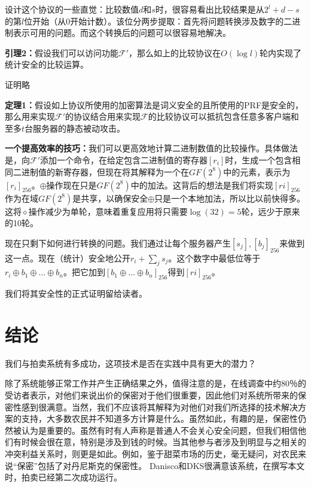 设计这个协议的一些直觉：比较数值$d$和$s$时，很容易看出比较结果是从$2^l+d-s$的第$l$位开始（从0开始计数）。该位分两步提取：首先将问题转换涉及数字的二进制表示可用的问题。而这个转换后的问题可以很容易地解决。
\newline

\noindent\textbf{引理2：}假设我们可以访问功能$\mathcal{F}'$，那么如上的比较协议在$O(\log l)$轮内实现了统计安全的比较运算。

证明略
\newline

\noindent\textbf{定理1：}假设如上协议所使用的加密算法是词义安全的且所使用的PRF是安全的，那么用来实现$\mathcal{F}'$的协议结合用来实现$\mathcal{F}$的比较协议可以抵抗包含任意多客户端和至多$t$台服务器的静态被动攻击。
\newline

\textbf{一个提高效率的技巧：}我们可以更高效地计算二进制数值的比较操作。具体做法是，向$\mathcal{F}'$添加一个命令，在给定包含二进制值的寄存器$[r_i]$时，生成一个包含相同二进制值的新寄存器，但现在将其解释为一个在$GF(2^8)$中的元素，表示为$[r_i]_{256}$。$\oplus$操作现在只是$GF(2^8)$中的加法。这背后的想法是我们将实现$[ri]_{256}$作为在域$GF(2^8)$是共享，以确保安全$\oplus$只是一个本地加法，所以比以前快得多。这将$\diamond$操作减少为单轮，意味着重复应用将只需要$\log(32)=5$轮，远少于原来的10轮。

现在只剩下如何进行转换的问题。我们通过让每个服务器产生$[s_j],[b_j]_{256}$来做到这一点。现在（统计）安全地公开$r_i+\sum_j s_j$。这个数字中最低位等于$r_i\oplus b_1\oplus\dots\oplus b_n$。把它加到$[b_1\oplus\dots\oplus b_n]_{256}$得到$[ri]_{256}$。

我们将其安全性的正式证明留给读者。

\section{结论}
我们与拍卖系统有多成功，这项技术是否在实践中具有更大的潜力？

除了系统能够正常工作并产生正确结果之外，值得注意的是，在线调查中约80％的受访者表示，对他们来说出价的保密对于他们很重要，因此他们对系统所带来的保密性感到很满意。当然，我们不应该将其解释为对他们对我们所选择的技术解决方案的支持，大多数农民并不知道多方计算是什么。虽然如此，有趣的是，保密性仍然被认为是重要的。虽然有时有人声称是普通人不会关心安全问题，但我们相信他们有时候会很在意，特别是涉及到钱的时候。当其他参与者涉及到明显与之相关的冲突利益关系时，则更是如此。例如，鉴于甜菜市场的历史，毫无疑问，对农民来说“保密”包括了对丹尼斯克的保密性。 Danisco和DKS很满意该系统，在撰写本文时，拍卖已经第二次成功运行。

